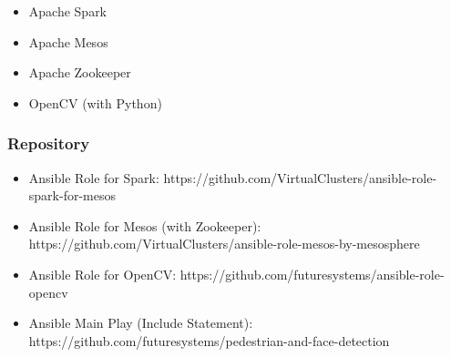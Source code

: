 \begin{itemize}
   \item Apache Spark 
   \item Apache Mesos
   \item Apache Zookeeper
   \item OpenCV (with Python)
\end{itemize}

\subsubsection{Repository}
\begin{itemize}

  \item Ansible Role for Spark: https://github.com/VirtualClusters/ansible-role-spark-for-mesos
  \item Ansible Role for Mesos (with Zookeeper): https://github.com/VirtualClusters/ansible-role-mesos-by-mesosphere
  \item Ansible Role for OpenCV: https://github.com/futuresystems/ansible-role-opencv
  \item Ansible Main Play (Include Statement): https://github.com/futuresystems/pedestrian-and-face-detection

\end{itemize}


